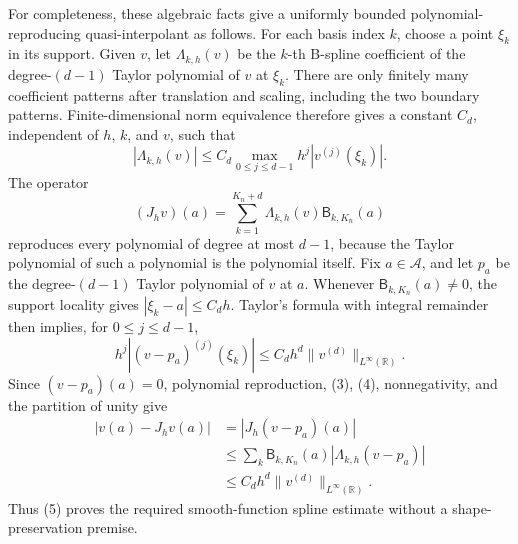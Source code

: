 For completeness, these algebraic facts give a uniformly bounded polynomial-reproducing quasi-interpolant as follows.  For each basis index \(k\), choose a point \(\xi_k\) in its support.  Given \(v\), let \(\Lambda_{k,h}(v)\) be the \(k\)-th B-spline coefficient of the degree-\((d-1)\) Taylor polynomial of \(v\) at \(\xi_k\).  There are only finitely many coefficient patterns after translation and scaling, including the two boundary patterns.  Finite-dimensional norm equivalence therefore gives a constant \(C_d\), independent of \(h\), \(k\), and \(v\), such that
\[
 |\Lambda_{k,h}(v)|
 \le C_d\max_{0\le j\le d-1}h^j|v^{(j)}(\xi_k)|.                 \tag{3}
\]
The operator
\[
 (J_hv)(a)=\sum_{k=1}^{K_n+d}\Lambda_{k,h}(v)\mathsf B_{k,K_n}(a)
\]
reproduces every polynomial of degree at most \(d-1\), because the Taylor polynomial of such a polynomial is the polynomial itself.  Fix \(a\in\mathcal A\), and let \(p_a\) be the degree-\((d-1)\) Taylor polynomial of \(v\) at \(a\).  Whenever \(\mathsf B_{k,K_n}(a)\ne0\), the support locality gives \(|\xi_k-a|\le C_dh\).  Taylor's formula with integral remainder then implies, for \(0\le j\le d-1\),
\[
 h^j\left|(v-p_a)^{(j)}(\xi_k)\right|
 \le C_dh^d\|v^{(d)}\|_{L^\infty(\mathbb R)}.                  \tag{4}
\]
Since \((v-p_a)(a)=0\), polynomial reproduction, (3), (4), nonnegativity, and the partition of unity give
\[
 \begin{aligned}
 |v(a)-J_hv(a)|
 &=|J_h(v-p_a)(a)|\\
 &\le \sum_k\mathsf B_{k,K_n}(a)
       |\Lambda_{k,h}(v-p_a)|\\
 &\le C_dh^d\|v^{(d)}\|_{L^\infty(\mathbb R)}.
                                                                    \tag{5}
 \end{aligned}
\]
Thus (5) proves the required smooth-function spline estimate without a shape-preservation premise.

